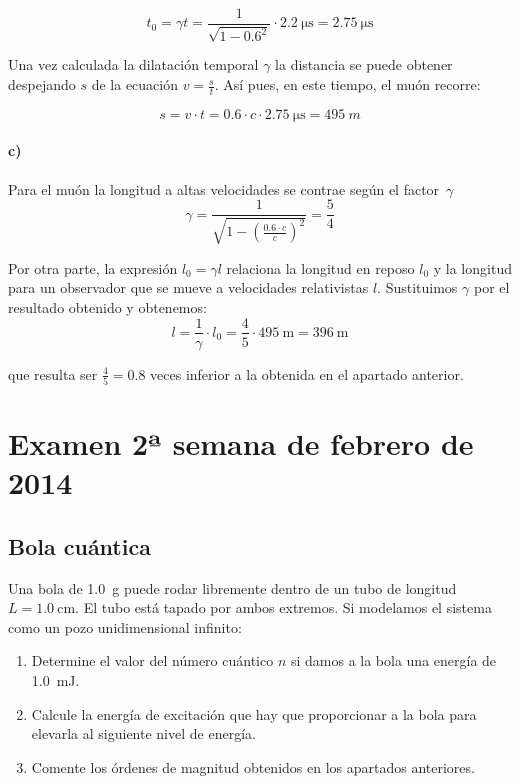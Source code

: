 \documentclass[12pt, a4paper]{article}
\begin{document}
        $$t_0 = \gamma t = \frac{1}{\sqrt{1-\num{0.6}^2}}\cdot \SI{2.2}{\micro\second} = \SI{2.75}{\micro\second}$$

        Una vez calculada la dilatación temporal $\gamma$ la distancia se puede obtener despejando $s$ de
        la ecuación $v=\frac{s}{t}$. Así pues, en este tiempo, el muón recorre:

        $$s=v\cdot t = \num{0.6}\cdot c \cdot \SI{2.75}{\micro\second} = \SI{495}{m}$$

        \paragraph{c)} Para el muón la longitud a altas velocidades se contrae según el \mbox{factor $\gamma$}
        $$\gamma = \frac{1}{\sqrt{1-\left(\frac{\num{0.6}\cdot c}{c}\right)^2}} = \frac{5}{4}$$

        Por otra parte, la expresión $l_0=\gamma l$ relaciona la longitud en reposo $l_0$ y la longitud para
        un observador que se mueve a velocidades relativistas $l$. Sustituimos $\gamma$ por el resultado
        obtenido y obtenemos:
        $$l=\frac{1}{\gamma}\cdot l_0 = \frac{4}{5} \cdot \SI{495}{\meter} = \SI{396}{\meter}$$

        que resulta ser $\frac{4}{5} = \num{0.8}$ veces inferior a la obtenida en el apartado anterior.






    \section{Examen 2ª semana de febrero de 2014}
    \setcounter{subsection}{0}
    \subsection{Bola cuántica}
    Una bola de \SI{1.0}{\gram} puede rodar libremente dentro de un tubo de longitud $L=\SI{1.0}{\centi\meter}$.
    El tubo está tapado por ambos extremos. Si modelamos el sistema como un pozo unidimensional infinito:
    \begin{enumerate}[label=\alph*)]
        \item Determine el valor del número cuántico $n$ si damos a la bola una energía de \SI{1.0}{\milli\J}.
        \item Calcule la energía de excitación que hay que proporcionar a la bola para elevarla al siguiente nivel
        de energía.
        \item Comente los órdenes de magnitud obtenidos en los apartados anteriores.
    \end{enumerate}
\end{document}
